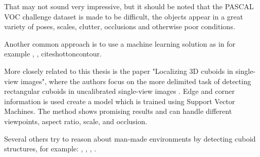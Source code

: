 That may not sound very impressive, but it should be noted that the PASCAL VOC challenge dataset is made to be difficult, the objects appear in a great variety of poses, scales, clutter, occlusions and otherwise poor conditions.\cite{everingham2010pascal}

Another common approach is to use a machine learning solution as in for example \cite{viola2001rapid}, \cite{fergus2003object}, cite{shottoncontour}.

More closely related to this thesis is the paper "Localizing 3D cuboids in single-view images", where the authors focus on the more delimited task of detecting rectangular cuboids in uncalibrated single-view images \cite{xiaolocalizing}.
Edge and corner information is used create a model which is trained using Support Vector Machines.
The method shows promising results and can handle different viewpoints, aspect ratio, scale, and occlusion.

Several others try to reason about man-made environments by detecting cuboid structures, for example: \cite{hedau2010thinking}, \cite{hedau2012recovering}, \cite{gupta2010estimating}, \cite{del2012bayesian}.
